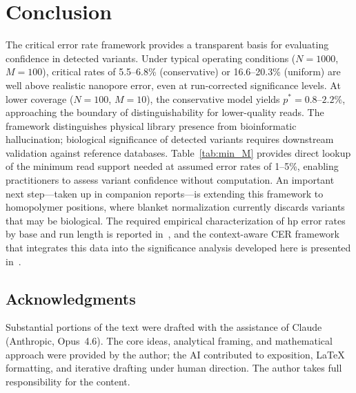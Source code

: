 \documentclass[11pt]{article}
\begin{document}
\section{Conclusion}

The critical error rate framework provides a transparent basis for evaluating
confidence in detected variants. Under typical operating conditions ($N = 1000$,
$M = 100$), critical rates of 5.5--6.8\% (conservative) or 16.6--20.3\%
(uniform) are well above realistic nanopore error, even at run-corrected
significance levels. At lower coverage ($N = 100$, $M = 10$), the conservative
model yields $p^* = 0.8$--$2.2\%$, approaching the boundary of
distinguishability for lower-quality reads. The framework distinguishes physical
library presence from bioinformatic hallucination; biological significance of
detected variants requires downstream validation against reference databases.
Table~\ref{tab:min_M} provides direct lookup of the minimum read support needed
at assumed error rates of 1--5\%, enabling practitioners to assess variant
confidence without computation. An important next step---taken up in companion
reports---is extending this framework to homopolymer positions, where blanket
normalization currently discards variants that may be biological. The required
empirical characterization of hp error rates by base and run length is reported
in~\cite{hp_paper}, and the context-aware CER framework that integrates this
data into the significance analysis developed here is presented
in~\cite{cer_practice}.

\subsection*{Acknowledgments}

Substantial portions of the text were drafted with the assistance of Claude
(Anthropic, Opus~4.6). The core ideas, analytical framing, and mathematical
approach were provided by the author; the AI contributed to exposition, \LaTeX{}
formatting, and iterative drafting under human direction. The author takes full
responsibility for the content.
\end{document}
